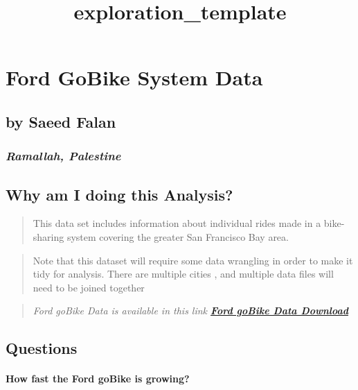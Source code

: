 \documentclass[11pt]{article}
\title{exploration\_template}
\begin{document}
    
    
    \maketitle
    
    

    
    \section{Ford GoBike System Data}\label{ford-gobike-system-data}

\subsection{by Saeed Falan}\label{by-saeed-falan}

\subsubsection{\texorpdfstring{\emph{Ramallah,
Palestine}}{Ramallah, Palestine}}\label{ramallah-palestine}

\subsection{Why am I doing this
Analysis?}\label{why-am-i-doing-this-analysis}

\begin{quote}
This data set includes information about individual rides made in a
bike-sharing system covering the greater San Francisco Bay area.
\end{quote}

\begin{quote}
Note that this dataset will require some data wrangling in order to make
it tidy for analysis. There are multiple cities , and multiple data
files will need to be joined together
\end{quote}

\begin{quote}
\emph{Ford goBike Data is available in this link
\href{https://s3.amazonaws.com/fordgobike-data/index.html}{\textbf{Ford
goBike Data Download}}}
\end{quote}

    \subsection{Questions}\label{questions}

\paragraph{How fast the Ford goBike is
growing?}\label{how-fast-the-ford-gobike-is-growing}
\end{document}
